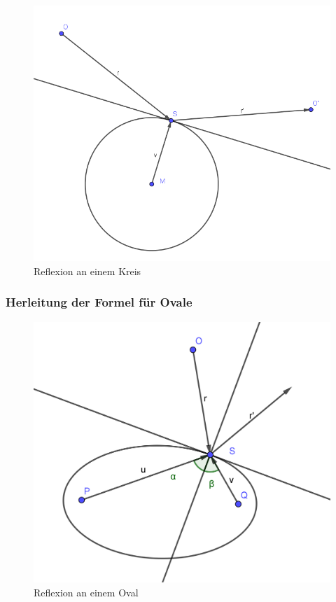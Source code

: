 \documentclass[reducespace,stylepage,semiarbeit]{spezidoc}
\begin{document}
\begin{figure}[h]
\centering
\includegraphics[scale=0.5]{pictures/CircleRef.png}
\caption{Reflexion an einem Kreis}
\end{figure}


\subsubsection*{Herleitung der Formel für Ovale}

\begin{figure}[h]
\centering
\includegraphics[scale=1]{pictures/OvalRef.png}
\caption{Reflexion an einem Oval}
\end{figure}
\end{document}
